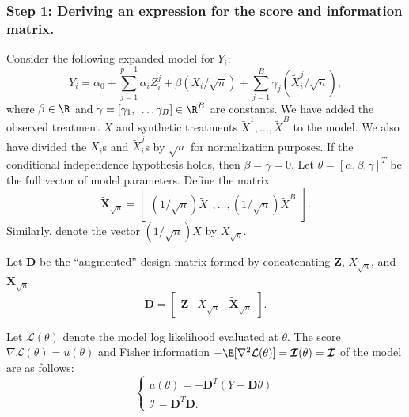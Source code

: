 \documentclass[12pt]{article}
\newcommand{\bs}[1]{\boldsymbol{#1}}
\newcommand{\infomat}{\bs{\mathcal{I}}}
\begin{document}
\subsubsection*{Step 1: Deriving an expression for the score and information matrix.} Consider the following expanded model for $Y_i$:
$$Y_i = \alpha_0 + \sum_{j=1}^{p-1} \alpha_i Z^j_i + \beta (X_i/\sqrt{n}) + \sum_{j=1}^B \gamma_j (\tilde{X}_i^j/\sqrt{n}),$$ where $\beta \in \R$ and $\gamma = [\gamma_1, \dots, \gamma_B] \in \R^B$ are constants. We have added the observed treatment $X$ and synthetic treatments $\tilde{X}^{1}, \dots, \tilde{X}^B$ to the model. We also have divided the $X_i$s and $\tilde{X}^j_i$s by $\sqrt{n}$ for normalization purposes. If the conditional independence hypothesis holds, then $\beta = \gamma = 0$. Let $\theta = [\alpha, \beta, \gamma]^T$ be the full vector of model parameters. Define the matrix $$\tilde{\bs{X}}_{\sqrt{n}} = \begin{bmatrix} (1/\sqrt{n})\tilde{X}^1, \dots, (1/\sqrt{n})\tilde{X}^B \end{bmatrix} .$$ Similarly, denote the vector $(1/\sqrt{n}) X$ by $X_{\sqrt{n}}.$ 

Let $\bs{D}$ be the ``augmented'' design matrix formed by concatenating $\bs{Z}$, $X_{\sqrt{n}}$, and $\tilde{\bs{X}}_{\sqrt{n}}$
$$ \bs{D} = \begin{bmatrix} \bs{Z} & X_{\sqrt{n}} & \tilde{\bs{X}}_{\sqrt{n}} \end{bmatrix}.$$

Let $\mathcal{L}(\theta)$ denote the model log likelihood evaluated at $\theta$. The score $\nabla \mathcal{L}(\theta) = u(\theta)$ and Fisher information $-\E[\nabla^2 \mathcal{L}(\theta)] = \infomat(\theta) = \infomat$ of the model are as follows:
$$
\begin{cases}
u(\theta) = -\bs{D}^T(Y - \bs{D}\theta) \\
\infomat = \bs{D}^T \bs{D}.
\end{cases} 
$$
\end{document}
